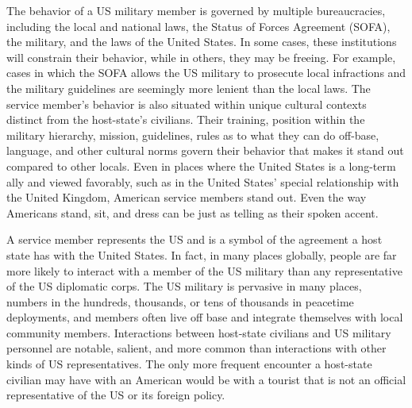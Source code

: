 {	%
	
The behavior of a US military member is governed by multiple bureaucracies, including the local and national laws, the Status of Forces Agreement (SOFA), the military, and the laws of the United States. In some cases, these institutions will constrain their behavior, while in others, they may be freeing. For example, cases in which the SOFA allows the US military to prosecute local infractions and the military guidelines are seemingly more lenient than the local laws. The service member's behavior is also situated within unique cultural contexts distinct from the host-state's civilians. Their training, position within the military hierarchy, mission, guidelines, rules as to what they can do off-base, language, and other cultural norms govern their behavior that makes it stand out compared to other locals. Even in places where the United States is a long-term ally and viewed favorably, such as in the United States' special relationship with the United Kingdom, American service members stand out. Even the way Americans stand, sit, and dress can be just as telling as their spoken accent. 

	
A service member represents the US and is a symbol of the agreement a host state has with the United States. In fact, in many places globally, people are far more likely to interact with a member of the US military than any representative of the US diplomatic corps. The US military is pervasive in many places, numbers in the hundreds, thousands, or tens of thousands in peacetime deployments, and members often live off base and integrate themselves with local community members. Interactions between host-state civilians and US military personnel are notable, salient, and more common than interactions with other kinds of US representatives. The only more frequent encounter a host-state civilian may have with an American would be with a tourist that is not an official representative of the US or its foreign policy.
	
}
